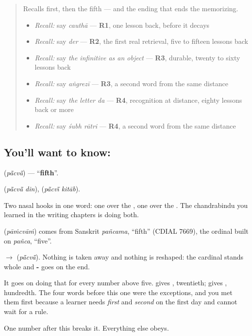 \label{lesson:HI-C75-fifth}



\begin{quote}
Recalls first, then the fifth — and the ending that ends the memorizing.

\begin{itemize}
\raggedright
  \item \emph{Recall:} say \emph{cauthā} — \textbf{R1}, one lesson back, before it decays
  \item \emph{Recall:} say \emph{der} — \textbf{R2}, the first real retrieval, five to fifteen lessons back
  \item \emph{Recall:} say \emph{the infinitive as an object} — \textbf{R3}, durable, twenty to sixty lessons back
  \item \emph{Recall:} say \emph{aṅgrezī} — \textbf{R3}, a second word from the same distance
  \item \emph{Recall:} say \emph{the letter da} — \textbf{R4}, recognition at distance, eighty lessons back or more
  \item \emph{Recall:} say \emph{śubh rātri} — \textbf{R4}, a second word from the same distance
\end{itemize}
\end{quote}

\subsection*{You'll want to know: }
\textbf{} (\emph{pā̃cvā̃}) — \textquotedblleft{}\textbf{fifth}\textquotedblright{}.

\textbf{ } (\emph{pā̃cvā̃ din}), \textbf{ } (\emph{pā̃cvī̃ kitāb}).

Two nasal hooks in one word: one over the \textbf{}, one over the \textbf{}. The chandrabindu you learned in the writing chapters is doing both.

\begin{cousinweb}
\textbf{} (\emph{pāṁcvāṁ}) comes from Sanskrit \emph{pañcama}, \textquotedblleft{}fifth\textquotedblright{} (CDIAL 7669), the ordinal built on \emph{pañca}, \textquotedblleft{}five\textquotedblright{}.
\end{cousinweb}

\begin{grammarlens}[title={Grammar Lens: the number, plus -\hi{वाँ}}]
\textbf{} $\to$ \textbf{} (\emph{pā̃cvā̃}). Nothing is taken away and nothing is reshaped: the cardinal stands whole and \textbf{-} goes on the end.

It goes on doing that for every number above five. \textbf{} gives \textbf{}, twentieth; \textbf{} gives \textbf{}, hundredth. The four words before this one were the exceptions, and you met them first because a learner needs \emph{first} and \emph{second} on the first day and cannot wait for a rule.

One number after this breaks it. Everything else obeys.
\end{grammarlens}

